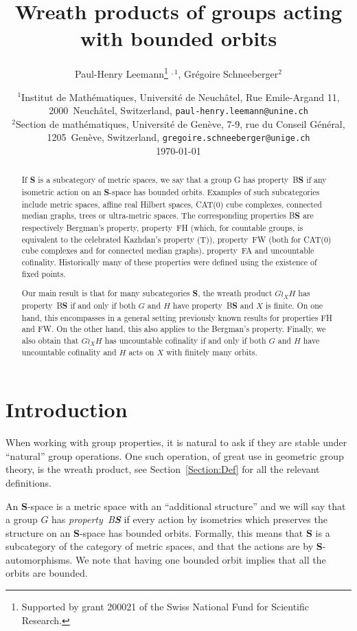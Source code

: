 \documentclass[a4paper]{article}
\title{Wreath products of groups acting with bounded orbits}
\author{Paul-Henry Leemann\thanks{Supported by grant 200021\textunderscore188578 of the Swiss National Fund for Scientific Research.} $^{,1}$, Grégoire Schneeberger$^2$}
\date{%
{\small $^1$Institut de Math\'ematiques, Universit\'e de Neuch\^atel, Rue Emile-Argand 11, 2000~Neuch\^atel, Switzerland, \texttt{paul-henry.leemann@unine.ch}}\\%
{\small $^2$Section de math\'ematiques, Universit\'e de Gen\`eve, 7-9, rue du Conseil G\'en\'eral, 1205~Gen\`eve, Switzerland, \texttt{gregoire.schneeberger@unige.ch}}\\[2ex]%
\today}
\theoremstyle{definition}
\newcommand*{\category}[1]{\textbf{#1}}
\newcommand*{\CatS}{\category{S}}
\newcommand*{\BS}{B\textbf{S}}
\newcommand*{\FH}{FH}
\newcommand*{\FW}{FW}
\newcommand*{\FA}{FA}
\begin{document}
\maketitle
%
%
%
%
%
%
%
%
%
%
\begin{abstract}
If \CatS{} is a subcategory of metric spaces, we say that a group G has property~\BS{} if any isometric action on an \CatS-space has bounded orbits.
Examples of such subcategories include metric spaces, affine real Hilbert spaces, CAT(0) cube complexes, connected median graphs, trees or ultra-metric spaces. 
The corresponding properties \BS{} are respectively Bergman's property, property~\FH{}  (which, for countable groups, is equivalent to the celebrated Kazhdan's property (T)), property~\FW{} (both for CAT(0) cube complexes and for connected median graphs), property~\FA{} and uncountable cofinality.
Historically many of these properties were defined using the existence of fixed points.

Our main result is that for many subcategories \CatS, the wreath product $G\wr_XH$ has property~\BS{} if and only if both $G$ and $H$ have property~\BS{} and $X$ is finite.
On one hand, this encompasses in a general setting previously known results for properties \FH{} and \FW.
On the other hand, this also applies to the Bergman's property.
Finally, we also obtain that $G\wr_XH$ has uncountable cofinality if and only if both $G$ and $H$ have uncountable cofinality and $H$ acts on $X$ with finitely many orbits.
\end{abstract}
%
%
%
%
%
%
%
%
%
%
%
%
%
%
%
%
%
%
%
%
%
%
%
%
%
\section{Introduction}\label{Section:Intro}
%
%
%
%
%
%
When working with group properties, it is natural to ask if they are stable under ``natural'' group operations.
One such operation, of great use in geometric group theory, is the wreath product, see Section~\ref{Section:Def} for all the relevant definitions.

An \CatS-space is a metric space with an ``additional structure'' and we will say that a group $G$ has \emph{property~\BS} if every action by isometries which preserves the structure on an \CatS-space has bounded orbits.
Formally, this means that \CatS{} is a subcategory of the category of metric spaces, and that the actions are by \CatS-automorphisms.
We note that having one bounded orbit implies that all the orbits are bounded.
\end{document}

